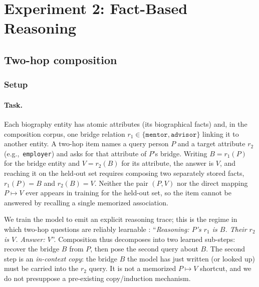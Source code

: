 \documentclass{article}
\begin{document}
\FloatBarrier


\section{Experiment 2: Fact-Based Reasoning}

\subsection{Two-hop composition}
\label{sec:twohop-task}

\subsubsection{Setup}

\paragraph{Task.} Each biography entity has atomic attributes (its biographical facts) and, in the composition corpus, one bridge relation $r_1\in\{\texttt{mentor},\texttt{advisor}\}$ linking it to another entity. A two-hop item names a query person $P$ and a target attribute $r_2$ (e.g.,\
\texttt{employer}) and asks for that attribute of $P$'s bridge. Writing $B=r_1(P)$ for the bridge entity and $V=r_2(B)$ for its attribute, the answer is $V$, and reaching it on the held-out set requires composing two separately stored facts, $r_1(P)=B$ and $r_2(B)=V$. Neither the pair $(P,V)$ nor the direct mapping $P\mapsto V$ ever appears in training for the held-out set, so the item cannot be answered by recalling a single memorized association.

We train the model to emit an explicit reasoning trace; this is the regime in which two-hop questions are reliably learnable \citep{wei2022cot,press2023compgap}: ``\textit{Reasoning: $P$'s $r_1$ is $B$. Their $r_2$ is $V$. Answer: $V$}''. Composition thus decomposes into two learned sub-steps: recover the bridge $B$ from $P$, then pose the second query about $B$. The second step is an \emph{in-context copy}: the bridge $B$ the model has just written (or looked up) must be carried into the $r_2$ query. It is not a memorized $P\mapsto V$ shortcut, and we do not presuppose a pre-existing copy/induction mechanism.
\end{document}

